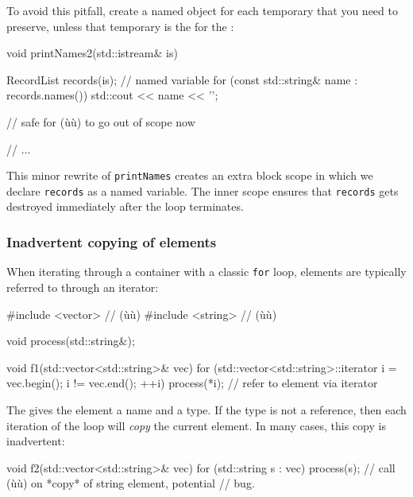 {{{To avoid this pitfall, create a named object for each temporary that you
need to preserve, unless that temporary is the 
for the :

\begin{emcppslisting}[emcppsbatch=e4]
void printNames2(std::istream& is)
{
    {
        RecordList records(is);  // named variable
        for (const std::string& name : records.names())
        {
            std::cout << name << '\n';
        }

        // safe for (ù{}ù) to go out of scope now
    }

    // ...
}
\end{emcppslisting}


\noindent This minor rewrite of \lstinline!printNames! creates an extra block scope
in which we declare \lstinline!records! as a named variable. The inner
scope ensures that \lstinline!records! gets destroyed immediately after the
loop terminates.

\subsubsection[Inadvertent copying of elements]{Inadvertent copying of elements}\label{inadvertent-copying-of-elements}

When iterating through a container with a classic \lstinline!for! loop,
elements are typically referred to through an iterator:

\begin{emcppshiddenlisting}[emcppsbatch=e5]
#include <vector>  // (ù{}ù)
#include <string>  // (ù{}ù)
\end{emcppshiddenlisting}
\begin{emcppslisting}[emcppsbatch=e5]
void process(std::string&);

void f1(std::vector<std::string>& vec)
{
    for (std::vector<std::string>::iterator i = vec.begin();
         i != vec.end(); ++i)
    {
        process(*i);  // refer to element via iterator
    }
}
\end{emcppslisting}


\noindent The  gives the element a name and
a type. If the type is not a reference, then each iteration of the loop
will \emph{copy} the current element. In many cases, this copy is
inadvertent:

\begin{emcppslisting}[emcppsbatch=e5]
void f2(std::vector<std::string>& vec)
{
    for (std::string s : vec)
    {
        process(s);  // call (ù{}ù) on *copy* of string element, potential
                     // bug.
    }
}
\end{emcppslisting}


}}}
